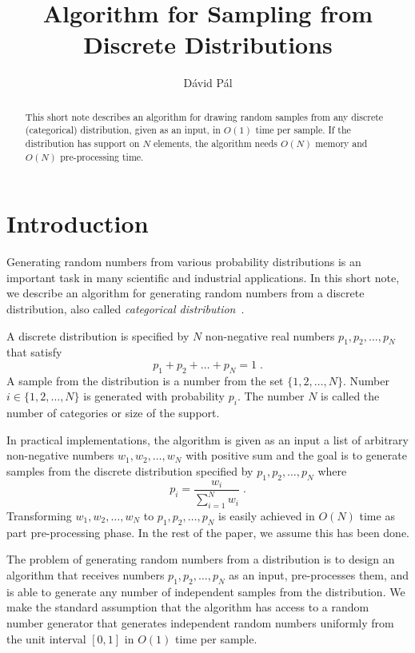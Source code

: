 \documentclass{article}
\title{Algorithm for Sampling from Discrete Distributions}
\author{D\'avid P\'al}
\begin{document}
\maketitle

\begin{abstract}
This short note describes an algorithm for drawing random samples from any
discrete (categorical) distribution, given as an input, in $O(1)$ time per
sample.  If the distribution has support on $N$ elements, the algorithm needs
$O(N)$ memory and $O(N)$ pre-processing time.
\end{abstract}

\section{Introduction}
\label{section:introduction}

Generating random numbers from various probability distributions is an
important task in many scientific and industrial applications. In this short
note, we describe an algorithm for generating random numbers from a discrete
distribution, also called \emph{categorical
distribution}~\cite{wikipedia:categorical_distribution}.

A discrete distribution is specified by $N$ non-negative real numbers
$p_1, p_2, \dots, p_N$ that satisfy
$$
p_1 + p_2 + \dots + p_N = 1 \; .
$$
A sample from the distribution is a number from the set $\{1,2,\dots,N\}$.
Number $i \in \{1,2,\dots,N\}$ is generated with probability $p_i$.  The number
$N$ is called the number of categories or size of the support.

In practical implementations, the algorithm is given as an input
a list of arbitrary non-negative numbers $w_1, w_2, \dots, w_N$
with positive sum and the goal is to generate samples from the discrete
distribution specified by $p_1, p_2, \dots, p_N$ where
$$
p_i = \frac{w_i}{\sum_{i=1}^N w_i} \; .
$$
Transforming $w_1, w_2, \dots, w_N$ to $p_1, p_2, \dots, p_N$ is easily
achieved in $O(N)$ time as part pre-processing phase.  In the rest of the
paper, we assume this has been done.

The problem of generating random numbers from a distribution is to design an
algorithm that receives numbers $p_1, p_2, \dots, p_N$ as an input,
pre-processes them, and is able to generate any number of independent samples
from the distribution. We make the standard assumption that the algorithm has
access to a random number generator that generates independent random numbers
uniformly from the unit interval $[0,1]$ in $O(1)$ time per sample.
\end{document}
